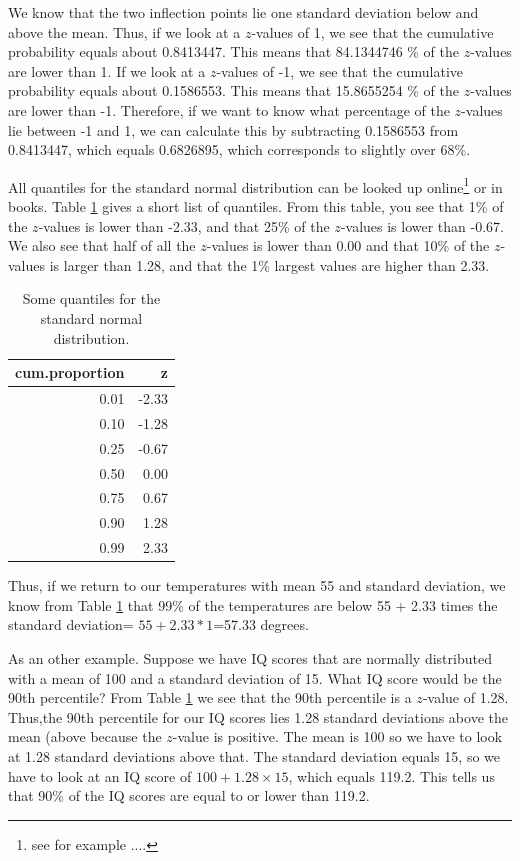 \documentclass[]{report}\usepackage[]{graphicx}\usepackage[]{color}
\begin{document}
We know that the two inflection points lie one standard deviation below and above the mean. Thus, if we look at a $z$-values of 1, we see that the cumulative probability equals about 0.8413447. This means that 84.1344746 \% of the $z$-values are lower than 1. If we look at a $z$-values of -1, we see that the cumulative probability equals about 0.1586553. This means that 15.8655254 \% of the $z$-values are lower than -1. Therefore, if we want to know what percentage of the $z$-values lie between -1 and 1, we can calculate this by subtracting 0.1586553 from 0.8413447, which equals 0.6826895, which corresponds to slightly over 68\%.

All quantiles for the standard normal distribution can be looked up online\footnote{see for example ....} or in books. Table \ref{tab:normal_4} gives a short list of quantiles. From this table, you see that 1\% of the $z$-values is lower than -2.33, and that 25\% of the $z$-values is lower than -0.67. We also see that half of all the $z$-values is lower than 0.00 and that 10\% of the $z$-values is larger than 1.28, and that the 1\% largest values are higher than 2.33.

\begin{table}[ht]
\centering
\caption{Some quantiles for the standard normal distribution.} 
\label{tab:normal_4}
\begin{tabular}{rr}
  \hline
cum.proportion & z \\ 
  \hline
0.01 & -2.33 \\ 
  0.10 & -1.28 \\ 
  0.25 & -0.67 \\ 
  0.50 & 0.00 \\ 
  0.75 & 0.67 \\ 
  0.90 & 1.28 \\ 
  0.99 & 2.33 \\ 
   \hline
\end{tabular}
\end{table}



Thus, if we return to our temperatures with mean 55 and standard deviation, we know from Table \ref{tab:normal_4} that 99\% of the temperatures are below 55 + 2.33 times the standard deviation=  $55+2.33*1$=57.33 degrees. 

As an other example. Suppose we have IQ scores that are normally distributed with a mean of 100 and a standard deviation of 15. What IQ score would be the 90th percentile? From Table \ref{tab:normal_4} we see that the 90th percentile is a $z$-value of 1.28. Thus,the 90th percentile for our IQ scores lies 1.28 standard deviations above the mean (above because the $z$-value is positive. The mean is 100 so we have to look at 1.28 standard deviations above that. The standard deviation equals 15, so we have to look at an IQ score of $100 + 1.28 \times 15$, which equals 119.2. This tells us that 90\% of the IQ scores are equal to or lower than 119.2.
\end{document}
